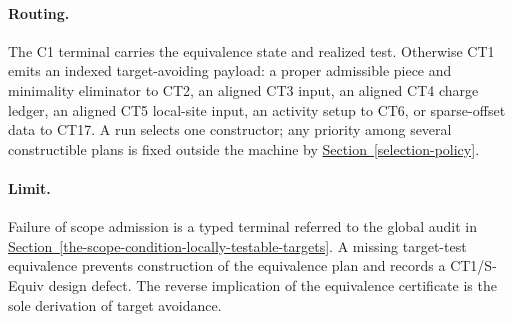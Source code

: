 \documentclass[
  11pt,
]{article}
\theoremstyle{definition}
\newcommand{\secref}[1]{\hyperref[#1]{Section~\ref*{#1}}}
\newcommand{\ctpar}[1]{\paragraph{#1.}}
\begin{document}
\ctpar{Routing}
The C1 terminal carries the equivalence state and realized test.  Otherwise
CT1 emits an indexed target-avoiding payload: a proper admissible piece and
minimality eliminator to CT2, an aligned CT3 input, an aligned CT4 charge
ledger, an aligned CT5 local-site input, an activity setup
to CT6, or sparse-offset data to CT17.  A run selects one constructor; any
priority among several constructible plans is fixed outside the machine by
\secref{selection-policy}.

\ctpar{Limit}
Failure of scope admission is a typed terminal referred to the global audit
in \secref{the-scope-condition-locally-testable-targets}.  A missing
target-test equivalence prevents construction of the equivalence plan and
records a CT1/S-Equiv design defect.  The reverse implication of the
equivalence certificate is the sole derivation of target avoidance.
\end{document}
